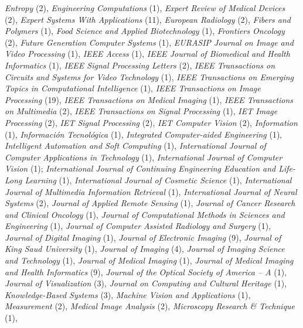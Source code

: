 \documentclass[11pt]{article}
\begin{document}
\begin{itemize}
    \emph{Entropy} (2),
    \emph{Engineering Computations} (1),
		\emph{Expert Review of Medical Devices} (2),
    \emph{Expert Systems With Applications} (11),
    \emph{European Radiology} (2),
    \emph{Fibers and Polymers} (1),
    \emph{Food Science and Applied Biotechnology} (1),
    \emph{Frontiers Oncology} (2),
    \emph{Future Generation Computer Systems} (1),
    \emph{EURASIP Journal on Image and Video Processing} (1),
		\emph{IEEE Access} (1),
    \emph{IEEE Journal of Biomedical and Health Informatics} (1),
    \emph{IEEE Signal Processing Letters} (2),
    \emph{IEEE Transactions on Circuits and Systems for Video Technology} (1),
    \emph{IEEE Transactions on Emerging Topics in Computational Intelligence} (1),
    \emph{IEEE Transactions on Image Processing} (19),
    \emph{IEEE Transactions on Medical Imaging} (1),
    \emph{IEEE Transactions on Multimedia} (2),
    \emph{IEEE Transactions on Signal Processing} (1),
    \emph{IET Image Processing} (2),
    \emph{IET Signal Processing} (2),
    \emph{IET Computer Vision} (2),
    \emph{Information} (1),
    \emph{Información Tecnológica} (1),
    \emph{Integrated Computer-aided Engineering} (1),
    \emph{Intelligent Automation and Soft Computing} (1),
    \emph{International Journal of Computer Applications in Technology} (1),
		\emph{International Journal of Computer Vision} (1);
    \emph{International  Journal  of Continuing  Engineering  Education and  Life-Long Learning} (1),
    \emph{International Journal of Cosmetic Science} (1),
    \emph{International Journal of Multimedia Information Retrieval} (1),
    \emph{International Journal of Neural Systems} (2),
    \emph{Journal of Applied Remote Sensing} (1),
    \emph{Journal of Cancer Research and Clinical Oncology} (1),
    \emph{Journal of Computational Methods in Sciences and Engineering} (1),
		\emph{Journal of Computer Assisted Radiology and Surgery} (1),
		\emph{Journal of Digital Imaging} (1),
    \emph{Journal of Electronic Imaging} (9),
		\emph{Journal of King Saud University} (1),
    \emph{Journal of Imaging} (4),
    \emph{Journal of Imaging Science and Technology} (1),
    \emph{Journal of Medical Imaging} (1),
    \emph{Journal of Medical Imaging and Health Informatics} (9),
    \emph{Journal of the Optical Society of America -- A} (1),
    \emph{Journal of Visualization} (3),
    \emph{Journal on Computing and Cultural Heritage} (1),
    \emph{Knowledge-Based Systems} (3),
    \emph{Machine Vision and Applications} (1),
    \emph{Measurement} (2),
		\emph{Medical Image Analysis} (2),
    \emph{Microscopy Research \& Technique} (1),

\end{itemize}
\end{document}
